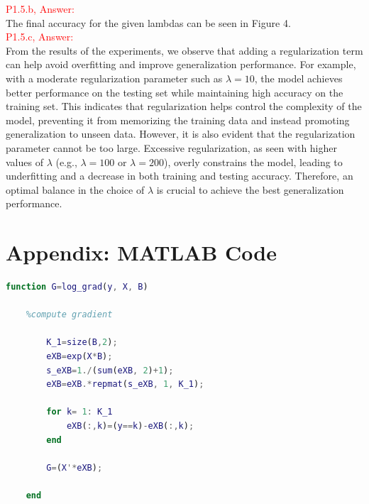 \documentclass[11pt]{article}
\begin{document}
\textcolor{red}{P1.5.b, Answer:}\\

The final accuracy for the given lambdas can be seen in Figure 4.\\

\textcolor{red}{P1.5.c, Answer:}\\

From the results of the experiments, we observe that adding a regularization term can help avoid overfitting and improve 
generalization performance. For example, with a moderate regularization parameter such as \( \lambda = 10 \), 
the model achieves better performance on the testing set while maintaining high accuracy on the training set. 
This indicates that regularization helps control the complexity of the model, preventing it from memorizing the training 
data and instead promoting generalization to unseen data. However, it is also evident that the regularization parameter cannot 
be too large. Excessive regularization, as seen with higher values of \( \lambda \) (e.g., \( \lambda = 100 \) or \( \lambda = 200 \)), 
overly constrains the model, leading to underfitting and a decrease in both training and testing accuracy. 
Therefore, an optimal balance in the choice of \( \lambda \) is crucial to achieve the best generalization performance.
\clearpage

\appendix

\section{Appendix: MATLAB Code}

\begin{lstlisting}[language = matlab]
	function G=log_grad(y, X, B) 

	%compute gradient 
	
		K_1=size(B,2);
		eXB=exp(X*B);
		s_eXB=1./(sum(eXB, 2)+1);
		eXB=eXB.*repmat(s_eXB, 1, K_1);
		
		for k= 1: K_1
			eXB(:,k)=(y==k)-eXB(:,k);
		end
		
		G=(X'*eXB);
	
	end
\end{lstlisting}
\end{document}
